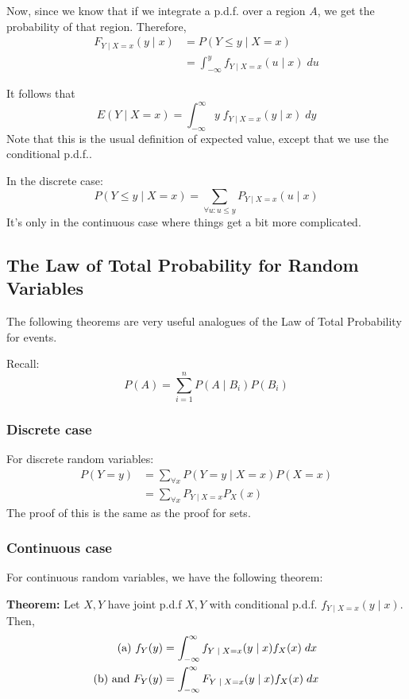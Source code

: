 \documentclass[12pt]{article}
\begin{document}
Now, since we know that if we integrate a p.d.f. over a region $A$, we get the probability of that region. Therefore,
\begin{align*}
    F_{Y \; | \; X = x} (y \; | \; x) &= P(Y \leq y \; | \; X = x) \\
        &= \int_{- \infty}^y f_{Y \; | \; X = x} (u \; | \; x) \; du
\end{align*}

It follows that
\[
    E(Y \; | \; X = x) = \int_{- \infty}^{\infty} y \; f_{Y \; | \; X = x} (y \; | \; x) \; dy
\]
Note that this is the usual definition of expected value, except that we use the conditional p.d.f..

In the discrete case:
\[
    P(Y \leq y \; | \; X = x) = \sum_{\forall u : u \leq y} P_{Y \; | \; X = x} (u \; | \; x)
\]
It's only in the continuous case where things get a bit more complicated.

\subsection{The Law of Total Probability for Random Variables}
The following theorems are very useful analogues of the Law of Total Probability for events. 

Recall:
\[
    P(A) = \sum_{i = 1}^n P(A \; | \; B_i)P(B_i)
\] 

\subsubsection{Discrete case}
For discrete random variables:
\begin{align*}
    P(Y = y) &= \sum_{\forall x} P(Y = y \; | \; X = x)P(X = x) \\
        &= \sum_{\forall x} P_{Y \; | \; X = x} P_X (x)
\end{align*}
The proof of this is the same as the proof for sets.

\subsubsection{Continuous case}
For continuous random variables, we have the following theorem:

\textbf{Theorem:} Let $X,Y$ have joint p.d.f $X,Y$ with conditional p.d.f. $f_{Y \; | \; X = x} (y \; | \; x)$. Then,
\begin{align*}
    \textnormal{(a) } f_Y (y) &= \int_{-\infty}^{\infty} f_{Y \; | \; X = x} (y \; | \; x) f_X (x) \; dx \\
    \textnormal{(b) and } F_Y (y) &= \int_{-\infty}^{\infty} F_{Y \; | \; X = x} (y \; | \; x) f_X (x) \; dx
\end{align*}
\end{document}
